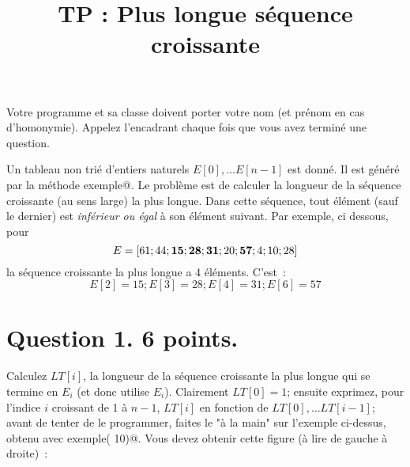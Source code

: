 \documentclass[a4paper]{article}
\begin{document}
\date{}
\title{TP : Plus longue s\'equence croissante}
\maketitle

Votre programme et sa classe doivent porter votre nom (et pr\'enom en cas d'homonymie). Appelez l'encadrant chaque fois que vous avez termin\'e 
une question. 

Un tableau non tri\'e d'entiers naturels  $E[0], \ldots E[n-1]$  est donn\'e.
Il est g\'en\'er\'e par la m\'ethode \verb@ exemple@.
Le probl\`eme est de calculer la longueur de la s\'equence croissante (au sens large) la plus longue.
Dans cette s\'equence, tout \'el\'ement (sauf le dernier) 
est {\it inf\'erieur ou \'egal} \`a  son \'el\'ement suivant.
Par exemple, ci dessous, pour $$E=[61 ;   44 ;      {\bf 15} ;     {\bf  28} ;      {\bf 31} ;      20 ;      {\bf 57} ;      4 ;       10 ;      28]$$
la  s\'equence croissante la  plus longue a 4 \'el\'ements.
C'est~:
$$ E[2]=15; E[3]=28;        E[4]=31;        E[6]=57$$


\section*{Question 1. 6 points.}  Calculez   $LT[i]$,  la longueur 
de la s\'equence croissante la plus longue qui se termine en $E_i$ (et donc utilise $E_i$).  
Clairement $LT[0]=1$; ensuite  exprimez, pour l'indice $i$ croissant de 1 \`a $n-1$,  $LT[i]$ en fonction de $LT[0], \ldots LT[i-1]$;
avant de tenter de le programmer, faites le  "\`a la main" sur l'exemple ci-dessus, obtenu avec \verb@ exemple( 10)@.
Vous devez obtenir cette figure (\`a lire de gauche \`a droite)~:

\begin{comment}
$$
\begin{array}{|c|c|c|c|c|c|c|c|c|c|c|}
\hline
i &  0 &  1 &  2 &  3 &  4 &  5 &  6 &  7 &  8 &  9 \\
\hline
E_i & 61 &   44 &      15 &      28 &      31 &      20 &      57 &      4 &       10 &      28 \\
LT_i&1 &    1 &       1 &       2 &       3 &       2 &       4 &       1 &       2 &       3 \\
V_i & -- & 4 &       10 &      28 &      57 &      -- &    -- &    -- &    -- &    -- \\
\hline
\end{array}
$$
\end{comment}
\end{document}
